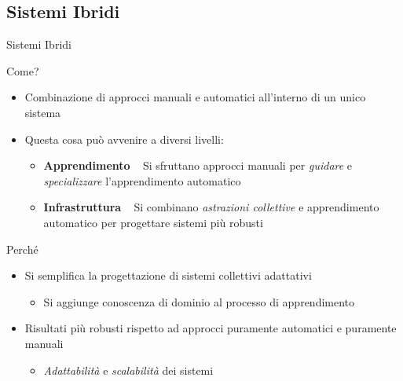 \documentclass[presentation, 10pt,aspectratio=169]{beamer}\mode<presentation>{\usetheme{AMSBolognaFC}}
\begin{document}
	\subsection{Sistemi Ibridi}
\begin{frame}{Sistemi Ibridi}
	\begin{exampleblock}{Come?}
		\begin{itemize}
			\item Combinazione di approcci manuali e automatici all'interno di un unico sistema
			\item Questa cosa può avvenire a diversi livelli:
			\begin{itemize}
				\item \textbf{Apprendimento} \faArrowRight ~ Si sfruttano approcci manuali per \emph{guidare} e \emph{specializzare} l'apprendimento automatico
				\item \textbf{Infrastruttura} \faArrowRight ~ Si combinano \emph{astrazioni collettive} e apprendimento automatico per progettare sistemi più robusti
			\end{itemize}
		\end{itemize}
	\end{exampleblock}
	\begin{alertblock}{Perché}
		\begin{itemize}
			\item Si semplifica la progettazione di sistemi collettivi adattativi
			\begin{itemize}
				\item Si aggiunge conoscenza di dominio al processo di apprendimento
			\end{itemize}

			\item Risultati più robusti rispetto ad approcci puramente automatici e puramente manuali
			\begin{itemize}
				\item \emph{Adattabilità} e \emph{scalabilità} dei sistemi
			\end{itemize}
		\end{itemize}
	\end{alertblock}
\end{frame}
\end{document}
